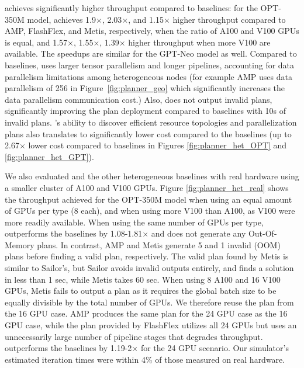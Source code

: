 \sailor achieves significantly higher throughput compared to baselines: for the OPT-350M model, \sailor achieves 1.9$\times$, 2.03$\times$, and 1.15$\times$ higher throughput compared to AMP, FlashFlex, and Metis, respectively, when the ratio of A100 and V100 GPUs is equal, and 1.57$\times$, 1.55$\times$, 1.39$\times$ higher throughput when more V100 are available. 
The speedups are similar for the GPT-Neo model as well. Compared to baselines, \sailor uses larger tensor parallelism and longer pipelines, accounting for data parallelism limitations among heterogeneous nodes (for example AMP uses data parallelism of 256 in Figure~\ref{fig:planner_geo} which significantly increases the data parallelism communication cost.) Also, \sailor does not output invalid plans, significantly improving the plan deployment compared to baselines with 10s of invalid plans. 
\sailor's ability to discover efficient resource topologies and parallelization plans also translates to significantly lower cost compared to the baselines (up to 2.67$\times$ lower cost compared to baselines in Figures \ref{fig:planner_het_OPT} and \ref{fig:planner_het_GPT}).

We also evaluated \sailor and the other heterogeneous baselines with real hardware using a smaller cluster of A100 and V100 GPUs. Figure \ref{fig:planner_het_real} shows the throughput achieved for the OPT-350M model when using an equal amount of GPUs per type (8 each), and when using more V100 than A100, as V100 were more readily available. When using the same number of GPUs per type, \sailor outperforms the baselines by 1.08-1.81$\times$ and does not generate any Out-Of-Memory plans. In contrast, AMP and Metis generate 5 and 1 invalid (OOM) plans before finding a valid plan, respectively. The valid plan found by Metis is similar to Sailor’s, but Sailor avoids invalid outputs entirely, and finds a solution in less than 1 sec, while Metis takes 60 sec.
When using 8 A100 and 16 V100 GPUs, Metis fails to output a plan as it requires the global batch size to be equally divisible by the total number of GPUs. We therefore reuse the plan from the 16 GPU case. AMP produces the same plan for the 24 GPU case as the 16 GPU case, while the plan provided by FlashFlex utilizes all 24 GPUs but uses an unnecessarily large number of pipeline stages that degrades throughput. \sailor outperforms the baselines by 1.19-2$\times$ for the 24 GPU scenario. Our simulator's estimated iteration times were within 4\% of those measured on real hardware.


